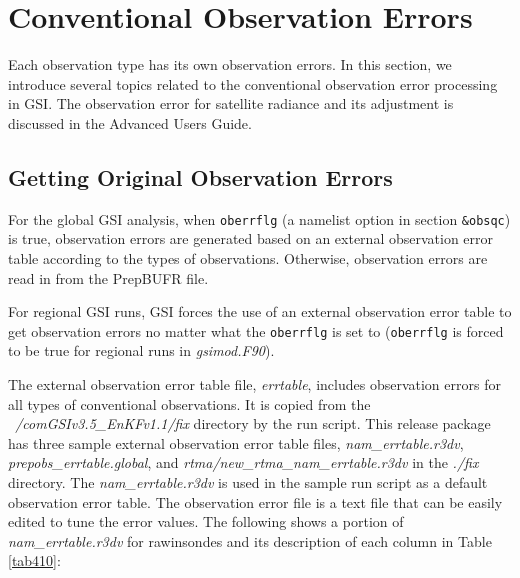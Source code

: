 \section{Conventional Observation Errors}

Each observation type has its own observation errors. In this section, we introduce several topics related to the conventional observation error processing in GSI. The observation error for satellite radiance and its adjustment is discussed in the Advanced User\textquotesingle s Guide.

\subsection{Getting Original Observation Errors}
\label{sec4.7.1}

For the global GSI analysis, when \verb|oberrflg| (a namelist option in section \verb|&obsqc|) is true, observation errors are generated based on an external observation error table according to the types of observations. Otherwise, observation errors are read in from the PrepBUFR file.

For regional GSI runs, GSI forces the use of an external observation error table to get observation errors no matter what the \verb|oberrflg| is set to (\verb|oberrflg| is forced to be true for regional runs in \textit{gsimod.F90}).

The external observation error table file, \textit{errtable}, includes observation errors for all types of conventional observations. It is copied from the \textit{~/comGSIv3.5\_EnKFv1.1/fix} directory by the run script. This release package has three sample external observation error table files, \textit{nam\_errtable.r3dv}, \textit{prepobs\_errtable.global}, and \textit{rtma/new\_rtma\_nam\_errtable.r3dv} in the \textit{./fix} directory. The \textit{nam\_errtable.r3dv} is used in the sample run script as a default observation error table. The observation error file is a text file that can be easily edited to tune the error values. The following shows a portion of \textit{nam\_errtable.r3dv} for rawinsondes and its description of each column in Table \ref{tab410}:

